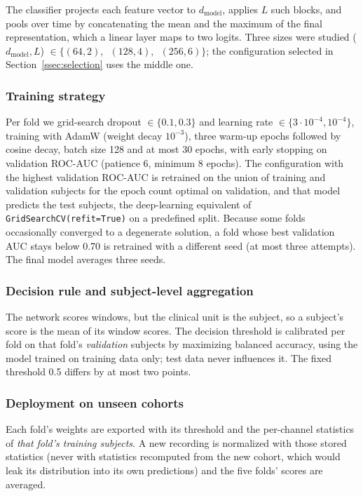 The classifier projects each feature vector to $d_{\text{model}}$, applies $L$ such blocks,
and pools over time by concatenating the mean and the maximum of the final
representation, which a linear layer maps to two logits. Three sizes were
studied ($d_{\text{model}}, L$) $\in \{(64,2),$\allowbreak\ $(128,4),$\allowbreak\ $(256,6)\}$; the
configuration selected in Section~\ref{ssec:selection} uses the middle one.

\subsubsection{Training strategy}
Per fold we grid-search dropout $\in \{0.1, 0.3\}$ and learning rate
$\in \{3\!\cdot\!10^{-4}, 10^{-4}\}$, training with AdamW (weight decay
$10^{-3}$), three warm-up epochs followed by cosine decay, batch size 128 and
at most 30 epochs, with early stopping on validation ROC-AUC (patience 6,
minimum 8 epochs). The configuration with the highest validation ROC-AUC is
retrained on the union of training and validation subjects for the epoch count
optimal on validation, and that model predicts the test subjects, the
deep-learning equivalent of \texttt{GridSearchCV(refit=True)} on a predefined
split. Because some folds occasionally converged to a degenerate solution, a
fold whose best validation AUC stays below 0.70 is retrained with a different
seed (at most three attempts). The final model averages three seeds.

\subsubsection{Decision rule and subject-level aggregation}
The network scores windows, but the clinical unit is the subject, so a
subject's score is the mean of its window scores. The decision threshold is
calibrated per fold on that fold's \emph{validation} subjects by maximizing
balanced accuracy, using the model trained on training data only; test data
never influences it. The fixed threshold 0.5 differs by at most two points.

\subsubsection{Deployment on unseen cohorts}
Each fold's weights are exported with its threshold and the per-channel
statistics of \emph{that fold's training subjects}. A new recording is
normalized with those stored statistics (never with statistics recomputed
from the new cohort, which would leak its distribution into its own predictions)
and the five folds' scores are averaged.

